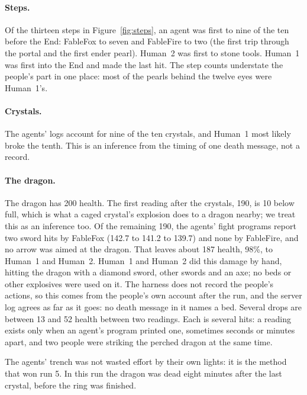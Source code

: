 \documentclass[11pt,a4paper]{article}
\begin{document}
\paragraph{Steps.} Of the thirteen steps in Figure~\ref{fig:steps}, an agent was first to nine of the ten before the End: FableFox to seven and FableFire to two (the first trip through the portal and the first ender pearl). Human~2 was first to stone tools. Human~1 was first into the End and made the last hit. The step counts understate the people's part in one place: most of the pearls behind the twelve eyes were Human~1's.

\paragraph{Crystals.} The agents' logs account for nine of the ten crystals, and Human~1 most likely broke the tenth. This is an inference from the timing of one death message, not a record.

\paragraph{The dragon.} The dragon has 200 health. The first reading after the crystals, 190, is 10 below full, which is what a caged crystal's explosion does to a dragon nearby; we treat this as an inference too. Of the remaining 190, the agents' fight programs report two sword hits by FableFox (142.7 to 141.2 to 139.7) and none by FableFire, and no arrow was aimed at the dragon. That leaves about 187 health, 98\%, to Human~1 and Human~2. Human~1 and Human~2 did this damage by hand, hitting the dragon with a diamond sword, other swords and an axe; no beds or other explosives were used on it. The harness does not record the people's actions, so this comes from the people's own account after the run, and the server log agrees as far as it goes: no death message in it names a bed. Several drops are between 13 and 52 health between two readings. Each is several hits: a reading exists only when an agent's program printed one, sometimes seconds or minutes apart, and two people were striking the perched dragon at the same time.

The agents' trench was not wasted effort by their own lights: it is the method that won run 5. In this run the dragon was dead eight minutes after the last crystal, before the ring was finished.
\end{document}
